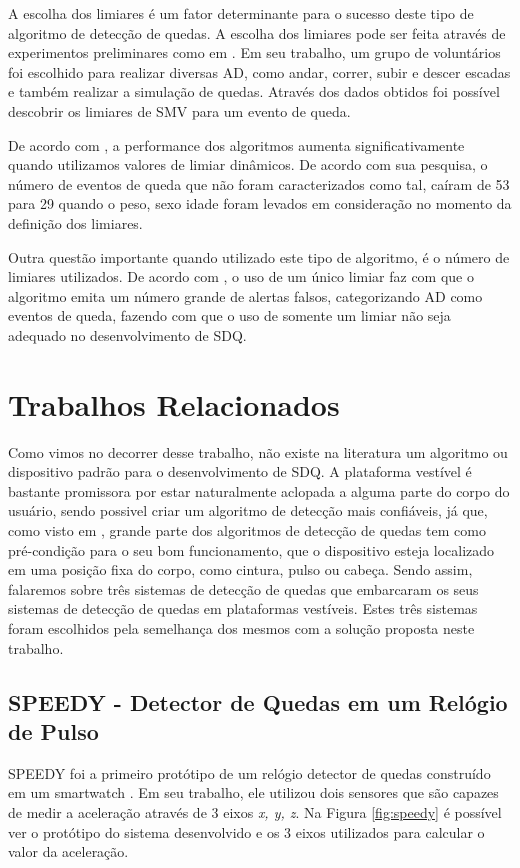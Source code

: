 A escolha dos limiares é um fator determinante para o sucesso deste tipo de algoritmo de detecção de quedas. A escolha dos limiares pode ser feita através de experimentos preliminares como em \cite{zhang2013honey}. Em seu trabalho, um grupo de voluntários foi escolhido para realizar diversas \ac{AD}, como andar, correr, subir e descer escadas e também realizar a simulação de quedas. Através dos dados obtidos foi possível descobrir os limiares de \ac{SMV} para um evento de queda.  

De acordo com \cite{cao2012falld}, a performance dos algoritmos aumenta significativamente quando utilizamos valores de limiar dinâmicos. De acordo com sua pesquisa, o número de eventos de queda que não foram caracterizados como tal, caíram de 53 para 29 quando o peso, sexo idade foram levados em consideração no momento da definição dos limiares.

Outra questão importante quando utilizado este tipo de algoritmo, é o número de limiares utilizados. De acordo com \cite{casilari2015analysis}, o uso de um único limiar faz com que o algoritmo emita um número grande de alertas falsos, categorizando \ac{AD} como eventos de queda, fazendo com que o uso de somente um limiar não seja adequado no desenvolvimento de \ac{SDQ}.


\section{Trabalhos Relacionados}
\label{sec:FDS_examples}
Como vimos no decorrer desse trabalho, não existe na literatura um algoritmo ou dispositivo padrão para o desenvolvimento de \ac{SDQ}. A plataforma vestível é bastante promissora por estar naturalmente aclopada a alguma parte do corpo do usuário, sendo possivel criar um algoritmo de detecção mais confiáveis, já que, como visto em \cite{casilari2015analysis}, grande parte dos algoritmos de detecção de quedas tem como pré-condição para o seu bom funcionamento, que o dispositivo esteja localizado em uma posição fixa do corpo, como cintura, pulso ou cabeça. Sendo assim, falaremos sobre três sistemas de detecção de quedas que embarcaram os seus sistemas de detecção de quedas em plataformas vestíveis. Estes três sistemas foram escolhidos pela semelhança dos mesmos com a solução proposta neste trabalho.

\subsection{SPEEDY - Detector de Quedas em um Relógio de Pulso}
SPEEDY foi a primeiro protótipo de um relógio detector de quedas construído em um smartwatch \citep{degen2003speedy}. Em seu trabalho, ele  utilizou dois sensores que são capazes de medir a aceleração através de 3 eixos \textit{x, y, z}. Na Figura \ref{fig:speedy} é possível ver o protótipo do sistema desenvolvido e os 3 eixos utilizados para calcular o valor da aceleração. 

